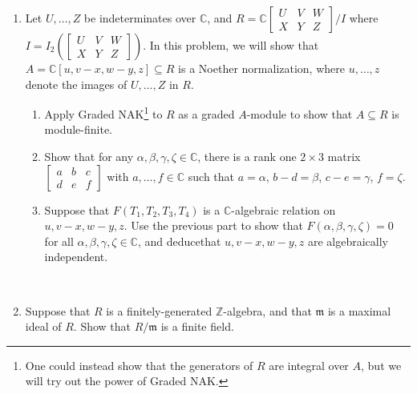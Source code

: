 \documentclass[12pt]{amsart}
\newcommand{\Z}{\mathbb{Z}}
\newcommand{\C}{\mathbb{C}}
\newcommand{\m}{\mathfrak{m}}
\begin{document}
\begin{enumerate}
\item Let $U,\dots,Z$ be indeterminates over $\C$, and $\displaystyle R= \C \begin{bmatrix} U & V & W \\ X & Y & Z \end{bmatrix} \Big/ I$ where $I=I_2\left(\begin{bmatrix} U & V & W \\ X & Y & Z \end{bmatrix}\right)$. In this problem, we will show that $A=\C[u, v-x, w-y, z] \subseteq R$ is a Noether normalization, where $u,\dots,z$ denote the images of $U,\dots,Z$ in $R$.
\begin{enumerate}
\item Apply Graded NAK\footnote{One could instead show that the generators of $R$ are integral over $A$, but we will try out the power of Graded NAK.} to $R$ as a graded $A$-module to show that $A\subseteq R$ is module-finite.
\item Show that for any $\alpha,\beta,\gamma,\zeta \in \C$, there is a rank one $2\times 3$ matrix $\begin{bmatrix}  a & b & c \\ d & e & f\end{bmatrix}$ with $a,\dots,f\in \C$ such that $a =\alpha$, $b-d = \beta$, $c-e= \gamma$, $f=\zeta$.
\item Suppose that $F(T_1,T_2,T_3,T_4)$ is a $\C$-algebraic relation on $u,v-x,w-y,z$. Use the previous part to show that $F(\alpha,\beta,\gamma,\zeta)=0$ for all $\alpha,\beta,\gamma,\zeta \in \C$, and deduce\footnotemark[1] that $u,v-x,w-y,z$ are algebraically independent.
\end{enumerate}

\


\item Suppose that $R$ is a finitely-generated $\Z$-algebra, and that $\m$ is a maximal ideal of $R$. Show that $R/\m$ is a finite field.





\end{enumerate}
\end{document}
